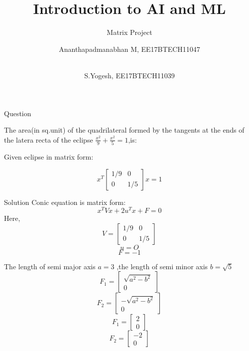 \documentclass{beamer}
\title{Introduction to AI and ML}
\subtitle{Matrix Project}
\author{Ananthapadmanabhan M, EE17BTECH11047 \and \\S.Yogesh, EE17BTECH11039}
\begin{document}
\begin{frame}

\titlepage
 
\end{frame}  

\begin{frame}[t]{Question}

The area(in sq.unit) of the quadrilateral formed by the tangents at the ends of the latera recta of the eclipse $\frac{x^2}{9} + \frac{x^2}{5} = 1$,is:

\vspace{1.5em}

Given eclipse in matrix form:
\vspace{1.5em}

\[x^T
\begin{bmatrix}
1/9 & 0\\
0 & 1/5
\end{bmatrix}
x
=
1
\]

\end{frame}


\begin{frame}{Solution}
Conic equation is matrix form:
\[x^T V x
+
2 u^T x
+
F
=
0
\]
Here,
\[V
=
\begin{bmatrix}
1/9 & 0\\
0 & 1/5
\end{bmatrix}
\]
\[u = O\]
\[
F = -1\]
\end{frame}

\begin{frame}
The length of semi major axis $a = 3$
,the length of semi minor axis $b = \sqrt{5}$
\[F_1 = 
\begin{bmatrix}
\sqrt{a^2 - b^2}\\
0
\end{bmatrix}\]
\[F_2 = 
\begin{bmatrix}
-\sqrt{a^2 - b^2}\\
0
\end{bmatrix}\]
\[F_1 = 
\begin{bmatrix}
2\\
0
\end{bmatrix}\]
\[F_2 = 
\begin{bmatrix}
-2\\
0
\end{bmatrix}\]
\end{frame}
   
\end{document}
